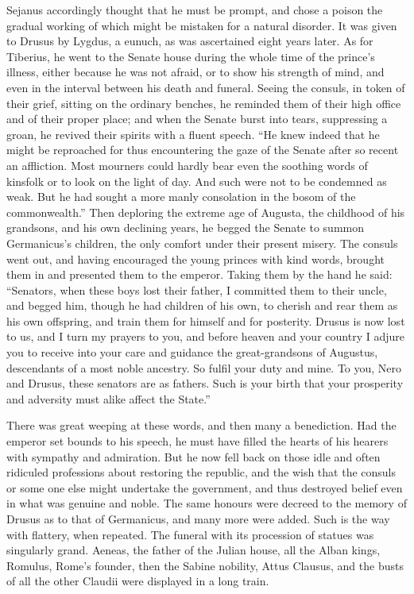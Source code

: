 
Sejanus accordingly thought that he must be prompt, and chose a poison the gradual working of which might be mistaken for a natural disorder. It was given to Drusus by Lygdus, a eunuch, as was ascertained eight years later. As for Tiberius, he went to the Senate house during the whole time of the prince's illness, either because he was not afraid, or to show his strength of mind, and even in the interval between his death and funeral. Seeing the consuls, in token of their grief, sitting on the ordinary benches, he reminded them of their high office and of their proper place; and when the Senate burst into tears, suppressing a groan, he revived their spirits with a fluent speech. ``He knew indeed that he might be reproached for thus encountering the gaze of the Senate after so recent an affliction. Most mourners could hardly bear even the soothing words of kinsfolk or to look on the light of day. And such were not to be condemned as weak. But he had sought a more manly consolation in the bosom of the commonwealth.'' Then deploring the extreme age of Augusta, the childhood of his grandsons, and his own declining years, he begged the Senate to summon Germanicus's children, the only comfort under their present misery. The consuls went out, and having encouraged the young princes with kind words, brought them in and presented them to the emperor. Taking them by the hand he said: ``Senators, when these boys lost their father, I committed them to their uncle, and begged him, though he had children of his own, to cherish and rear them as his own offspring, and train them for himself and for posterity. Drusus is now lost to us, and I turn my prayers to you, and before heaven and your country I adjure you to receive into your care and guidance the great-grandsons of Augustus, descendants of a most noble ancestry. So fulfil your duty and mine. To you, Nero and Drusus, these senators are as fathers. Such is your birth that your prosperity and adversity must alike affect the State.''


There was great weeping at these words, and then many a benediction. Had the emperor set bounds to his speech, he must have filled the hearts of his hearers with sympathy and admiration. But he now fell back on those idle and often ridiculed professions about restoring the republic, and the wish that the consuls or some one else might undertake the government, and thus destroyed belief even in what was genuine and noble. The same honours were decreed to the memory of Drusus as to that of Germanicus, and many more were added. Such is the way with flattery, when repeated. The funeral with its procession of statues was singularly grand. Aeneas, the father of the Julian house, all the Alban kings, Romulus, Rome's founder, then the Sabine nobility, Attus Clausus, and the busts of all the other Claudii were displayed in a long train.

